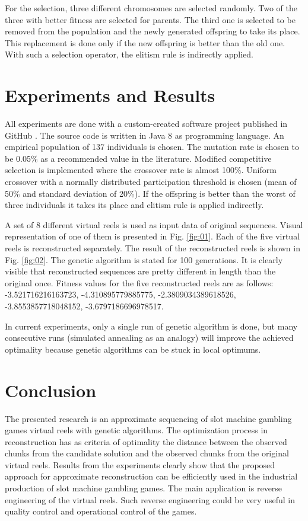 \documentclass[11pt]{article}
\begin{document}
For the selection, three different chromosomes are selected randomly. Two of the three with better fitness are selected for parents. The third one is selected to be removed from the population and the newly generated offspring to take its place. This replacement is done only if the new offspring is better than the old one. With such a selection operator, the elitism rule is indirectly applied.

\section{Experiments and Results}

All experiments are done with a custom-created software project published in GitHub \cite{Balabanov-2020}. The source code is written in Java 8 as programming language. An empirical population of 137 individuals is chosen. The mutation rate is chosen to be 0.05\% as a recommended value in the literature. Modified competitive selection is implemented where the crossover rate is almost 100\%. Uniform crossover with a normally distributed participation threshold is chosen (mean of 50\% and standard deviation of 20\%). If the offspring is better than the worst of three individuals it takes its place and elitism rule is applied indirectly. 

A set of 8 different virtual reels is used as input data of original sequences. Visual representation of one of them is presented in Fig. \ref{fig:01}. Each of the five virtual reels is reconstructed separately. The result of the reconstructed reels is shown in Fig. \ref{fig:02}. The genetic algorithm is stated for 100 generations. It is clearly visible that reconstructed sequences are pretty different in length than the original once. Fitness values for the five reconstructed reels are as follows: -3.521716216163723, -4.310895779885775, -2.3809034389618526, -3.8553857718048152, -3.6797186696978517.

In current experiments, only a single run of genetic algorithm is done, but many consecutive runs (simulated annealing as an analogy) will improve the achieved optimality because genetic algorithms can be stuck in local optimums.

\section{Conclusion}

The presented research is an approximate sequencing of slot machine gambling games virtual reels with genetic algorithms. The optimization process in reconstruction has as criteria of optimality the distance between the observed chunks from the candidate solution and the observed chunks from the original virtual reels. Results from the experiments clearly show that the proposed approach for approximate reconstruction can be efficiently used in the industrial production of slot machine gambling games. The main application is reverse engineering of the virtual reels. Such reverse engineering could be very useful in quality control and operational control of the games. 
\end{document}
